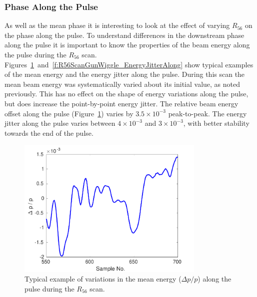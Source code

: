 \subsubsection{Phase Along the Pulse}

As well as the mean phase it is interesting to look at the effect of varying \(R_{56}\) on the phase along the pulse. To understand differences in the downstream phase along the pulse it is important to know the properties of the beam energy along the pulse during the \(R_{56}\) scan. Figures~\ref{f:R56ScanGunWiggle_MeanEnergyAlong}~and~\ref{f:R56ScanGunWiggle_EnergyJitterAlong} show typical examples of the mean energy and the energy jitter along the pulse. During this scan the mean beam energy was systematically varied about its initial value, as noted previously. This has no effect on the shape of energy variations along the pulse, but does increase the point-by-point energy jitter. The relative beam energy offset along the pulse (Figure~\ref{f:R56ScanGunWiggle_MeanEnergyAlong}) varies by \(3.5\times10^{-3}\) peak-to-peak. The energy jitter along the pulse varies between \(4\times10^{-3}\) and \(3\times10^{-3}\), with better stability towards the end of the pulse.

\begin{figure}
  \centering
  \includegraphics[width=0.8\textwidth]{Figures/propagation/R56ScanGunWiggle_MeanEnergyAlong}
  \caption{Typical example of variations in the mean energy (\(\Delta p/p\)) along the pulse during the \(R_{56}\) scan.}
  \label{f:R56ScanGunWiggle_MeanEnergyAlong}
\end{figure}

